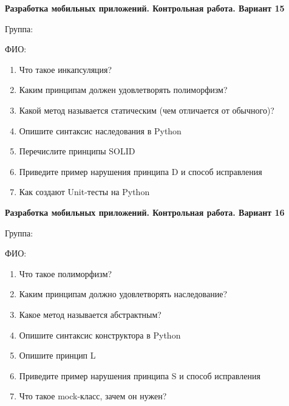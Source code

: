 \documentclass[12pt]{article}
\begin{document}
\vspace{40pt}\begin{minipage}{\textwidth}
\textbf{Разработка мобильных приложений. Контрольная работа. Вариант 15}

Группа: \underline{\hspace{3cm}}

ФИО: \underline{\hspace{10cm}}

\begin{enumerate}
\item Что такое инкапсуляция?
\item Каким принципам должен удовлетворять полиморфизм?
\item Какой метод называется статическим (чем отличается от обычного)?
\item Опишите синтаксис наследования в Python
\item Перечислите принципы SOLID
\item Приведите пример нарушения принципа D и способ исправления
\item Как создают Unit-тесты на Python

\end{enumerate}
\end{minipage}

\vspace{40pt}\begin{minipage}{\textwidth}
\textbf{Разработка мобильных приложений. Контрольная работа. Вариант 16}

Группа: \underline{\hspace{3cm}}

ФИО: \underline{\hspace{10cm}}

\begin{enumerate}
\item Что такое полиморфизм?
\item Каким принципам должно удовлетворять наследование?
\item Какое метод называется абстрактным?
\item Опишите синтаксис конструктора в Python
\item Опишите принцип L
\item Приведите пример нарушения принципа S и способ исправления
\item Что такое mock-класс, зачем он нужен?

\end{enumerate}
\end{minipage}
\end{document}

